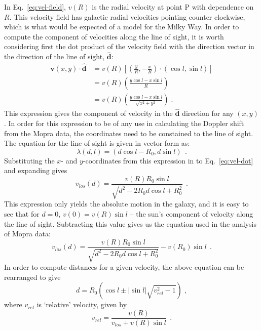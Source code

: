 \documentclass[a4paper, titlepage, oneside]{article}
\begin{document}
In Eq.~\eqref{eq:vel-field}, \(v(R)\) is the radial velocity at point P with dependence on \(R\). This velocity field has galactic radial velocities pointing counter clockwise, which is what would be expected of a model for the Milky Way. In order to compute the component of velocities along the line of sight, it is worth considering first the dot product of the velocity field with the direction vector in the direction of the line of sight, \(\mathbf{\hat{d}}\):
\begin{align}
  \mathbf{v}(x,y)\cdot\mathbf{\hat{d}}&=v(R)\left[\left(\frac{y}{R},-\frac{x}{R}\right)\!\cdot(\cos{l},\sin{l})\right] \\
  &=v(R)\left(\frac{y\cos{l}-x\sin{l}}{R}\right) \\
  &=v(R)\left(\frac{y\cos{l}-x\sin{l}}{\sqrt{x^2+y^2}}\right)\;.
  \label{eq:vel-dot}
\end{align}
This expression gives the component of velocity in the \(\mathbf{\hat{d}}\) direction for any \((x,y)\). In order for this expression to be of any use in calculating the Doppler shift from the Mopra data, the coordinates need to be constained to the line of sight. The equation for the line of sight is given in vector form as:
\begin{equation}
  \lambda(d,l)=(d\cos{l}-R_0,d\sin{l})\;\,.
\end{equation}
Substituting the \(x\)- and \(y\)-coordinates from this expression in to Eq.~\eqref{eq:vel-dot} and expanding gives
\begin{equation}
  v_{los}(d)=\frac{v(R)R_0\sin{l}}{\sqrt{d^2-2R_0d\cos{l}+R_0^2}}\;\,.
\end{equation}
This expression only yields the absolute motion in the galaxy, and it is easy to see that for \(d=0\), \(v(0)=v(R)\sin{l}\) -- the sun's component of velocity along the line of sight. Subtracting this value gives us the equation used in the analysis of Mopra data:
\begin{equation}
  v_{los}(d)=\frac{v(R)R_0\sin{l}}{\sqrt{d^2-2R_0d\cos{l}+R_0^2}}-v(R_0)\sin{l}\;\,.
\end{equation}
In order to compute distances for a given velocity, the above equation can be rearranged to give
\begin{equation}
  d=R_0\left(\cos{l}\pm|\sin{l}|\sqrt{v_{rel}^2-1}\right)\;,
\end{equation}
where \(v_{rel}\) is `relative' velocity, given by
\begin{equation}
  v_{rel}=\frac{v(R)}{v_{los}+v(R)\sin{l}}\;\,.
\end{equation}
\end{document}

